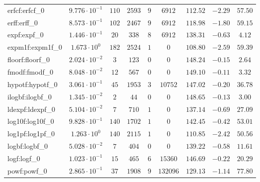 \begin{tabular}{|l|c|c|c|c|c|c|c|c|}
erfcf:erfcf\_0               & $ 9.776 \cdot 10^{-1} $ & $ 110    $ & $ 2593  $ & $ 9   $ & $ 6912   $ & $ 112.52      $ & $ -2.29   $ & $ 57.50   $ \\
erff:erff\_0                 & $ 8.573 \cdot 10^{-1} $ & $ 102    $ & $ 2467  $ & $ 9   $ & $ 6912   $ & $ 118.98      $ & $ -1.80   $ & $ 59.15   $ \\
expf:expf\_0                 & $ 1.446 \cdot 10^{-1} $ & $ 20     $ & $ 338   $ & $ 8   $ & $ 6912   $ & $ 138.31      $ & $ -0.63   $ & $ 4.12    $ \\
expm1f:expm1f\_0             & $ 1.673 \cdot 10^{0}  $ & $ 182    $ & $ 2524  $ & $ 1   $ & $ 0      $ & $ 108.80      $ & $ -2.59   $ & $ 59.39   $ \\
floorf:floorf\_0             & $ 2.024 \cdot 10^{-2} $ & $ 3      $ & $ 123   $ & $ 0   $ & $ 0      $ & $ 148.24      $ & $ -0.15   $ & $ 2.64    $ \\
fmodf:fmodf\_0               & $ 8.048 \cdot 10^{-2} $ & $ 12     $ & $ 567   $ & $ 0   $ & $ 0      $ & $ 149.10      $ & $ -0.11   $ & $ 3.32    $ \\
hypotf:hypotf\_0             & $ 3.061 \cdot 10^{-1} $ & $ 45     $ & $ 1953  $ & $ 3   $ & $ 10752  $ & $ 147.02      $ & $ -0.20   $ & $ 36.78   $ \\
ilogbf:ilogbf\_0             & $ 1.345 \cdot 10^{-2} $ & $ 2      $ & $ 44    $ & $ 0   $ & $ 0      $ & $ 148.65      $ & $ -0.13   $ & $ 3.00    $ \\
ldexpf:ldexpf\_0             & $ 5.104 \cdot 10^{-2} $ & $ 7      $ & $ 710   $ & $ 1   $ & $ 0      $ & $ 137.14      $ & $ -0.69   $ & $ 27.09   $ \\
log10f:log10f\_0             & $ 9.828 \cdot 10^{-1} $ & $ 140    $ & $ 1702  $ & $ 1   $ & $ 0      $ & $ 142.45      $ & $ -0.42   $ & $ 53.01   $ \\
log1pf:log1pf\_0             & $ 1.263 \cdot 10^{0}  $ & $ 140    $ & $ 2115  $ & $ 1   $ & $ 0      $ & $ 110.85      $ & $ -2.42   $ & $ 50.56   $ \\
logbf:logbf\_0               & $ 5.028 \cdot 10^{-2} $ & $ 7      $ & $ 404   $ & $ 0   $ & $ 0      $ & $ 139.22      $ & $ -0.58   $ & $ 11.61   $ \\
logf:logf\_0                 & $ 1.023 \cdot 10^{-1} $ & $ 15     $ & $ 465   $ & $ 6   $ & $ 15360  $ & $ 146.69      $ & $ -0.22   $ & $ 20.29   $ \\
powf:powf\_0                 & $ 2.865 \cdot 10^{-1} $ & $ 37     $ & $ 1908  $ & $ 9   $ & $ 132096 $ & $ 129.13      $ & $ -1.14   $ & $ 77.80   $ \\

\end{tabular}
